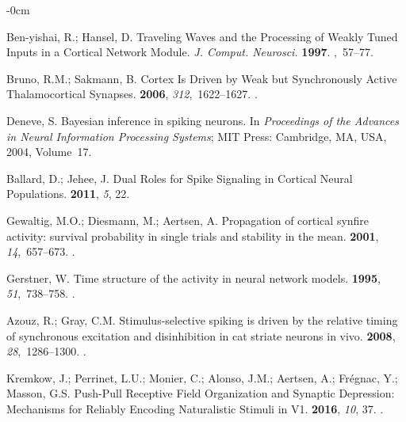 \documentclass[brainsci, %
               review,accept,pdftex,moreauthors
               ]{Definitions/mdpi}
\begin{document}
\begin{adjustwidth}{-\extralength}{0cm}
\begin{thebibliography}{999}
Ben-yishai, R.; Hansel, D.
\newblock Traveling {Waves} and the {Processing} of {Weakly} {Tuned} {Inputs}
  in a {Cortical} {Network} {Module}.  \emph{J. Comput. Neurosci.} {\bf 1997}.
,~57--77.


Bruno, R.M.; Sakmann, B.
\newblock Cortex {Is} {Driven} by {Weak} but {Synchronously} {Active}
  {Thalamocortical} {Synapses}.
 {\bf 2006}, {\em 312},~1622--1627.
.

Deneve, S.
\newblock Bayesian inference in spiking neurons.
\newblock In \emph{Proceedings of the Advances in {Neural} {Information} {Processing}
  {Systems}}; MIT Press: Cambridge, MA, USA, %
  2004, Volume~17.

Ballard, D.; Jehee, J.
\newblock Dual {Roles} for {Spike} {Signaling} in {Cortical} {Neural}
  {Populations}.
 {\bf 2011}, {\em 5}, 22.

Gewaltig, M.O.; Diesmann, M.; Aertsen, A.
\newblock Propagation of cortical synfire activity: survival probability in
  single trials and stability in the mean.
 {\bf 2001}, {\em 14},~657--673.
.

Gerstner, W.
\newblock Time structure of the activity in neural network models.
 {\bf 1995}, {\em 51},~738--758.\linebreak
{}.

Azouz, R.; Gray, C.M.
\newblock Stimulus-selective spiking is driven by the relative timing of
  synchronous excitation and disinhibition in cat striate neurons {in
  vivo}.
 {\bf 2008}, {\em
  28},~1286--1300.
.

Kremkow, J.; Perrinet, L.U.; Monier, C.; Alonso, J.M.; Aertsen, A.; Frégnac,
  Y.; Masson, G.S.
\newblock Push-{Pull} {Receptive} {Field} {Organization} and {Synaptic}
  {Depression}: {Mechanisms} for {Reliably} {Encoding} {Naturalistic} {Stimuli}
  in {V1}.
 {\bf 2016}, {\em 10}, 37.
.


\end{thebibliography}
\end{adjustwidth}
\end{document}
